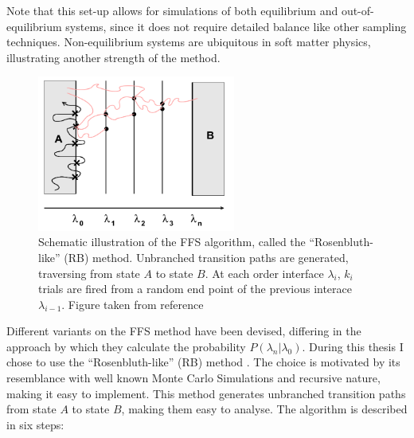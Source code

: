 Note that this set-up allows for simulations of both equilibrium and out-of-equilibrium
systems, since it does not require detailed balance like other sampling techniques.
Non-equilibrium systems are ubiquitous in soft matter physics, illustrating another
strength of the method.
\begin{figure}[ht]
\begin{center}
  \includegraphics[width=0.58\textwidth]{Figures/FFS.png}
  \caption[Schematic illustration of the “Rosenbluth-like” (RB) method]{Schematic
illustration of the FFS algorithm, called the “Rosenbluth-like” (RB) method. Unbranched
transition paths are generated, traversing from state $A$ to state $B$. At each order
interface $\lambda_i$, $k_i$ trials are fired from a random end point of the previous
interace $\lambda_{i-1}$. Figure taken from reference \cite{Allen2009}}
\end{center}
\end{figure}

Different variants on the FFS method have been devised, differing in the approach by
which they calculate the probability $P(\lambda_n|\lambda_0)$. During this thesis I
chose to use the “Rosenbluth-like” (RB) method \cite{Allen2009}. The choice
is motivated by its resemblance with well known Monte Carlo Simulations and recursive
nature, making it easy to implement.  This method generates unbranched transition paths
from state $A$ to state $B$, making them easy to analyse. The algorithm is described in
six steps:


